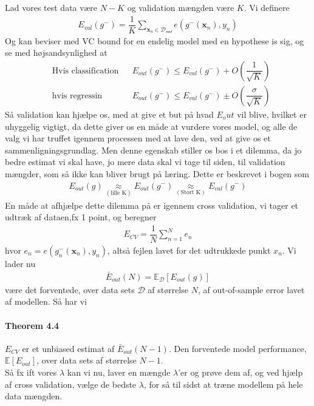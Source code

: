 \documentclass[paper=a4, fontsize=11pt]{scrartcl} %
\numberwithin{equation}{section} %
\numberwithin{figure}{section} %
\numberwithin{table}{section} %
\begin{document}
	Lad vores test data være $N-K$ og validation mængden være $K$. Vi definere
	\begin{align*}
	E_{val}(g^-)=\dfrac{1}{K}\sum_{\mathbf{x}_n \in\mathcal{D_{\text{val}}}}e(g^-(\mathbf{x}_n),y_n)
	\end{align*}
	Og kan beviser med VC bound for en endelig model med en hypothese is sig, og se med højsandsynlighed at
	\begin{align*}
	&\text{Hvis classification} && E_{out}(g^-)\leq E_{val}(g^-)+O\left(\dfrac{1}{\sqrt{K}}\right) \\
	&\text{hvis regressin} && E_{out}(g^-)\leq E_{val}(g^-)\pm O\left(\dfrac{\sigma}{\sqrt{K}}\right)
	\end{align*}
	Så validation kan hjælpe os, med at give et but på hvad $E_out$ vil blive, hvilket er uhyggelig vigtigt, da dette giver os en måde at vurdere vores model, og alle de valg vi har truffet igennem processen med at lave den, ved at give os et sammenligningsgrundlag. Men denne egenskab stiller os bos i et dilemma, da jo bedre estimat vi skal have, jo mere data skal vi tage til siden, til validation mængder, som så ikke kan bliver brugt på læring. Dette er beskrevet i bogen som
	\begin{align*}
	E_{out}(g)\underset{(\text{lille K})}{\approx} E_{out}(g^-)\underset{(\text{Stort K})}{\approx} E_{val}(g^-)
	\end{align*}
	En måde at afhjælpe dette dilemma på er igennem cross validation, vi tager et udtræk af dataen,fx 1 point, og beregner 
	\begin{align*}
	E_{CV}=\dfrac{1}{N}\sum_{n=1}^{N}e_n
	\end{align*}
	hvor $e_n=e(g^-_n(\mathbf{x}_n),y_n)$, altså fejlen lavet for det udtrukkede punkt $x_n$. Vi lader nu 
	\begin{align*}
	\bar{E}_{out}(N)=\mathbb{E}_\mathcal{D}[E_{out}(g)]
	\end{align*}
	være det forventede, over data sets $\mathcal{D}$ af størrelse $N$, af out-of-sample error lavet af modellen. Så har vi
	
	\paragraph{\textbf{Theorem 4.4}} $E_{CV}$ er et unbiased estimat af $\bar{E}_{out}(N-1)$. Den forventede model performance, $\mathbb{E}[E_{out}]$, over data sets af størrelse $N-1$. \\
	
	Så fx ift vores $\lambda$ kan vi nu, laver en mængde $\lambda$'er og prøve dem af, og ved hjælp af cross validation, vælge de bedste $\lambda$, for så til sidst at træne modellem på hele data mængden.
	
\end{document}
